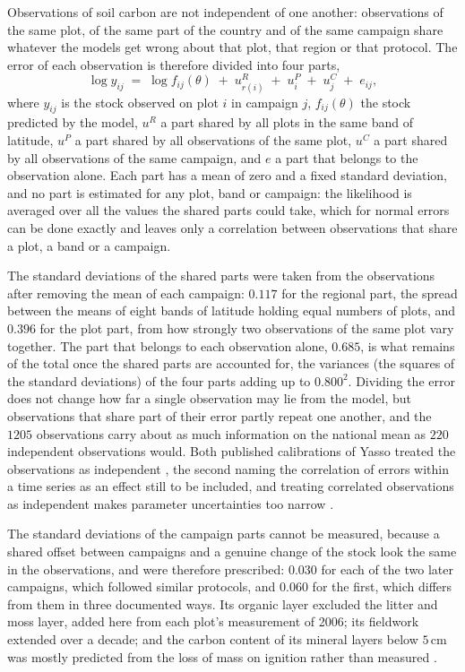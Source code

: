 \documentclass[11pt]{article}
\begin{document}
Observations of soil carbon are not independent of one another: observations of the same plot,
of the same part of the country and of the same campaign share whatever the models get wrong about
that plot, that region or that protocol. The error of each observation is therefore divided into
four parts,
\[
  \log y_{ij} \;=\; \log f_{ij}(\theta) \;+\; u^{R}_{r(i)} \;+\; u^{P}_{i} \;+\; u^{C}_{j} \;+\; e_{ij},
\]
where $y_{ij}$ is the stock observed on plot $i$ in campaign $j$, $f_{ij}(\theta)$ the stock
predicted by the model, $u^{R}$ a part shared by all plots in the same band of latitude, $u^{P}$ a
part shared by all observations of the same plot, $u^{C}$ a part shared by all observations of the
same campaign, and $e$ a part that belongs to the observation alone. Each part has a mean of zero
and a fixed standard deviation, and no part is estimated for any plot, band or campaign: the
likelihood is averaged over all the values the shared parts could take, which for normal errors
can be done exactly and leaves only a correlation between observations that share a plot, a band
or a campaign.

The standard deviations of the shared parts were taken from the observations after removing the
mean of each campaign: $0.117$ for the regional part, the spread between the means of eight bands
of latitude holding equal numbers of plots, and $0.396$ for the plot part, from how strongly two
observations of the same plot vary together. The part that belongs to each observation alone,
$0.685$, is what remains of the total once the shared parts are accounted for, the variances
(the squares of the standard deviations) of the four parts adding up to $0.800^2$. Dividing the
error does not change how far a single observation may lie from the model, but observations that
share part of their error partly repeat one another, and the $1205$ observations carry about as
much information on the national mean as $220$ independent observations would. Both published
calibrations of Yasso treated the observations as independent \citep{Tuomi2009,Viskari2022}, the
second naming the correlation of errors within a time series as an effect still to be included,
and treating correlated observations as independent makes parameter uncertainties too narrow
\citep{Oberpriller2021}.

The standard deviations of the campaign parts cannot be measured, because a shared offset between
campaigns and a genuine change of the stock look the same in the observations, and were therefore
prescribed: $0.030$ for each of the two later campaigns, which followed similar protocols, and
$0.060$ for the first, which differs from them in three documented ways. Its organic layer
excluded the litter and moss layer, added here from each plot's measurement of 2006; its
fieldwork extended over a decade; and the carbon content of its mineral layers below $5$\,cm was
mostly predicted from the loss of mass on ignition rather than measured \citep{Kramarenko}.
\end{document}
